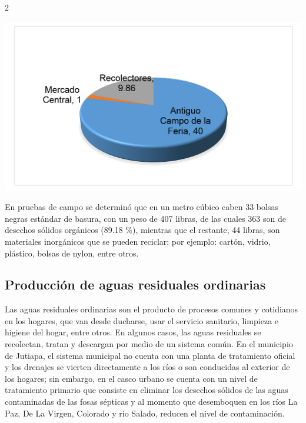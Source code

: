 \documentclass[11pt,spanish,Letterpaper,openany]{book}
\begin{document}
\begin {multicols}{2}
\begin {flushleft}
\noindent\begin{minipage}[c]{\columnwidth}

\includegraphics[width=1\linewidth]{images/201901-gfong-imagen02}

\end{minipage}

\end {flushleft}

En pruebas de campo se determinó que en un metro cúbico caben 33 bolsas negras estándar de basura, con un peso de 407 libras, de las cuales 363 son de desechos sólidos orgánicos (89.18 \%), mientras que el restante, 44 libras, son materiales inorgánicos que se pueden reciclar; por ejemplo: cartón, vidrio, plástico, bolsas de nylon, entre otros.

\hypertarget{produccion-de-aguas-residuales-ordinarias}{%
\subsection{Producción de aguas residuales ordinarias}\label{produccion-de-aguas-residuales-ordinarias}}

Las aguas residuales ordinarias son el producto de procesos comunes y cotidianos en los hogares, que van desde ducharse, usar el servicio sanitario, limpieza e higiene del hogar, entre otros. En algunos casos, las aguas residuales se recolectan, tratan y descargan por medio de un sistema común. En el municipio de Jutiapa, el sistema municipal no cuenta con una planta de tratamiento oficial y los drenajes se vierten directamente a los ríos o son conducidas al exterior de los hogares; sin embargo, en el casco urbano se cuenta con un nivel de tratamiento primario que consiste en eliminar los desechos sólidos de las aguas contaminadas de las fosas sépticas y al momento que desemboquen en los ríos La Paz, De La Virgen, Colorado y río Salado, reducen el nivel de contaminación.


\end{multicols}
\end{document}
